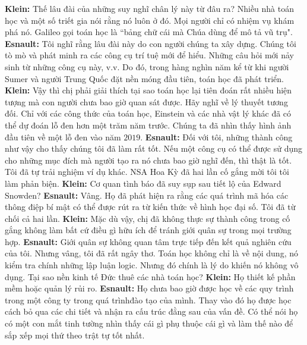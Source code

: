 \begin{multicols}{2}
	\vskip 0.1cm
	\textbf{\color{doithoaitoanhoc}Klein:} Thế lâu đài của những suy nghĩ chân lý này từ đâu ra? Nhiều nhà toán học và một số triết gia nói rằng nó luôn ở đó. Mọi người chỉ có nhiệm vụ khám phá nó. Galileo gọi toán học là ``bảng chữ cái mà Chúa dùng để mô tả vũ trụ".
	\vskip 0.1cm
	\textbf{\color{doithoaitoanhoc}Esnault:} Tôi nghĩ rằng lâu đài này do con người chúng ta xây dựng. Chúng tôi tò mò và phát minh ra các công cụ trí tuệ mới để hiểu. Những câu hỏi mới nảy sinh từ những công cụ này, v.v. Do đó, trong hàng nghìn năm kể từ khi người Sumer và người Trung Quốc đặt nền móng đầu tiên, toán học đã phát triển.
	\vskip 0.1cm
	\textbf{\color{doithoaitoanhoc}Klein:} Vậy thì chị phải giải thích tại sao toán học lại tiên đoán rất nhiều hiện tượng mà con người chưa bao giờ quan sát được. Hãy nghĩ về lý thuyết tương đối. Chỉ với các công thức của toán học, Einstein và các nhà vật lý khác đã có thể dự đoán lỗ đen hơn một trăm năm trước. Chúng ta đã nhìn thấy hình ảnh đầu tiên về một lỗ đen vào năm $2019$.
	\vskip 0.1cm
	\textbf{\color{doithoaitoanhoc}Esnault:} Đối với tôi, những thành công như vậy cho thấy chúng tôi đã làm rất tốt. Nếu một công cụ có thể được sử dụng cho những mục đích mà người tạo ra nó chưa bao giờ nghĩ đến, thì thật là tốt. Tôi đã tự trải nghiệm ví dụ khác. NSA Hoa Kỳ đã hai lần cố gắng mời tôi tôi làm phản biện.
	\vskip 0.1cm
	\textbf{\color{doithoaitoanhoc}Klein:} Cơ quan tình báo đã suy sụp sau tiết lộ của Edward Snowden?
	\vskip 0.1cm
	\textbf{\color{doithoaitoanhoc}Esnault:} Vâng. Họ đã phát hiện ra rằng các quá trình mã hóa các thông điệp bí mật có thể được rút ra từ kiến thức về hình học đại số. Tôi đã từ chối cả hai lần.
	\vskip 0.1cm
	\textbf{\color{doithoaitoanhoc}Klein:} Mặc dù vậy, chị đã không thực sự \linebreak thành công trong cố gắng không làm bất cứ điều gì hữu ích để tránh giới quân sự trong mọi trường hợp.
	\vskip 0.1cm
	\textbf{\color{doithoaitoanhoc}Esnault:} Giới quân sự không quan tâm trực tiếp đến kết quả nghiên cứu của tôi. Nhưng vâng, tôi đã rất ngây thơ. Toán học không chỉ là về nội dung, nó kiểm tra chính những lập luận logic. Nhưng đó chính là lý do khiến nó không vô dụng. Tại sao nền kinh tế Đức thuê các nhà toán học?
	\vskip 0.1cm
	\textbf{\color{doithoaitoanhoc}Klein:} Họ thiết kế phần mềm hoặc quản lý rủi ro.
	\vskip 0.1cm
	\textbf{\color{doithoaitoanhoc}Esnault:} Họ chưa bao giờ được học về các quy trình trong một công ty trong quá trình\linebreak đào tạo của mình. Thay vào đó họ được học cách bỏ qua các chi tiết và nhận ra cấu trúc đằng sau của vấn đề. Có thể nói họ có một con mắt tinh tường nhìn thấy cái gì phụ thuộc cái gì và làm thế nào để sắp xếp mọi thứ theo trật tự tốt nhất.

\end{multicols}

